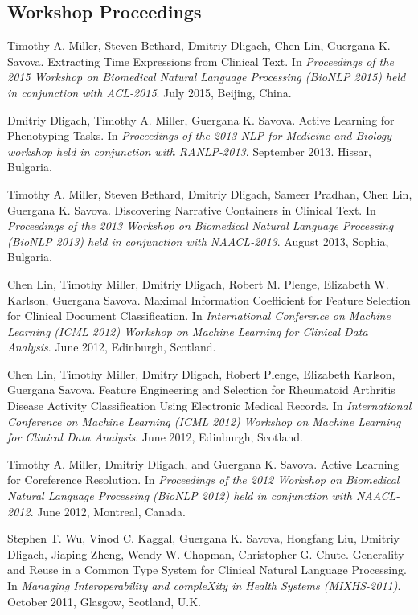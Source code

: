 \documentclass[letterpaper]{article}
\renewenvironment{itemize}{
  \begin{list}{}{
    \setlength{\leftmargin}{1.5em}
  }
}{
  \end{list}
}
\begin{document}
\subsection*{Workshop Proceedings}

\begin{itemize}

\item Timothy A. Miller, Steven Bethard, Dmitriy Dligach, Chen Lin, Guergana K. Savova. Extracting Time Expressions from Clinical Text. In \emph{Proceedings of the 2015 Workshop on Biomedical Natural Language Processing (BioNLP 2015) held in conjunction with ACL-2015}. July 2015, Beijing, China.
\item Dmitriy Dligach, Timothy A. Miller, Guergana K. Savova. Active Learning for Phenotyping Tasks. In \emph{Proceedings of the 2013 NLP for Medicine and Biology workshop held in conjunction with RANLP-2013}. September 2013. Hissar, Bulgaria.
\item Timothy A. Miller, Steven Bethard, Dmitriy Dligach, Sameer Pradhan, Chen Lin, Guergana K. Savova. Discovering Narrative Containers in Clinical Text. In \emph{Proceedings of the 2013 Workshop on Biomedical Natural Language Processing (BioNLP 2013) held in conjunction with NAACL-2013}. August 2013, Sophia, Bulgaria.
\item Chen Lin, Timothy Miller, Dmitriy Dligach, Robert M. Plenge, Elizabeth W. Karlson, Guergana Savova. Maximal Information Coefficient for Feature Selection for Clinical Document Classification. In \emph{International Conference on Machine Learning (ICML 2012) Workshop on Machine Learning for Clinical Data Analysis}. June 2012, Edinburgh, Scotland. 
\item Chen Lin, Timothy Miller, Dmitry Dligach, Robert Plenge, Elizabeth Karlson, Guergana Savova. Feature Engineering and Selection for Rheumatoid Arthritis Disease Activity Classification Using Electronic Medical Records. In \emph{International Conference on Machine Learning (ICML 2012) Workshop on Machine Learning for Clinical Data Analysis}. June 2012, Edinburgh, Scotland. 
\item Timothy A. Miller, Dmitriy Dligach, and Guergana K. Savova. Active Learning for Coreference Resolution. In \emph{Proceedings of the 2012 Workshop on Biomedical Natural Language Processing (BioNLP 2012) held in conjunction with NAACL-2012}. June 2012, Montreal, Canada.
\item Stephen T. Wu, Vinod C. Kaggal, Guergana K. Savova, Hongfang Liu, Dmitriy Dligach, Jiaping Zheng, Wendy W. Chapman, Christopher G. Chute. Generality and Reuse in a Common Type System for Clinical Natural Language Processing. In \emph{Managing Interoperability and compleXity in Health Systems (MIXHS-2011)}. October 2011, Glasgow, Scotland, U.K.

\end{itemize}
\end{document}
